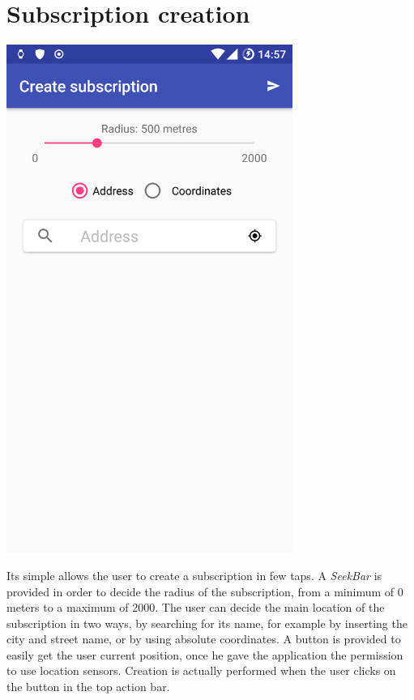 \documentclass[a4paper]{scrreprt}
\begin{document}
\section{Subscription creation}
\begin{minipage}{0.5\textwidth}
	\centering
	\includegraphics[width=0.7\textwidth]{imgs/subscription_create}
\end{minipage}
\begin{minipage}{0.5\textwidth}
	Its simple allows the user to create a subscription in few taps. A \emph{SeekBar} is provided in order to decide the radius of the subscription, from a minimum of 0 meters to a maximum of 2000. The user can decide the main location of the subscription in two ways, by searching for its name, for example by inserting the city and street name, or by using absolute coordinates. A button is provided to easily get the user current position, once he gave the application the permission to use location sensors. Creation is actually performed when the user clicks on the button in the top action bar.
\end{minipage}
\end{document}
